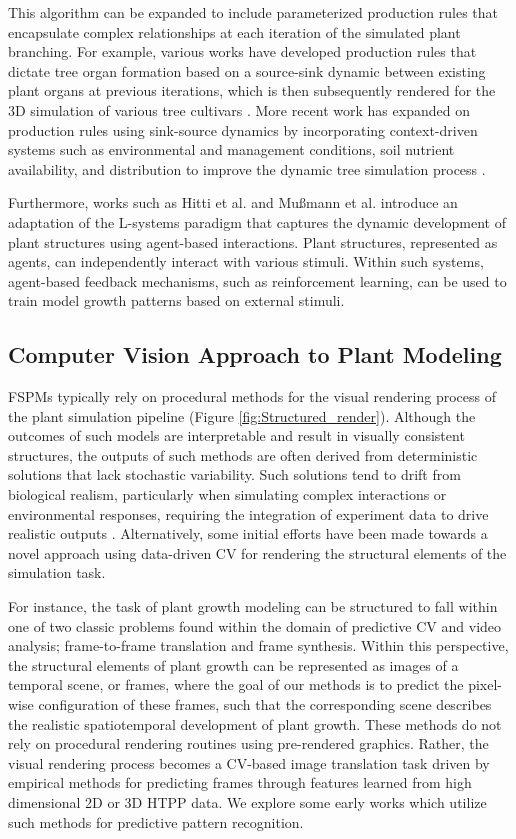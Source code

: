 \documentclass{article}
\begin{document}
\pagebreak

This algorithm can be expanded to include parameterized production rules that encapsulate complex relationships at each iteration of the simulated plant branching. For example, various works have developed production rules that dictate tree organ formation based on a source-sink dynamic between existing plant organs at previous iterations, which is then subsequently rendered for the 3D simulation of various tree cultivars \cite{LPeaches2005,dejong2015almond}. More recent work has expanded on production rules using sink-source dynamics by incorporating context-driven systems such as environmental and management conditions, soil nutrient availability, and distribution to improve the dynamic tree simulation process \cite{LPeaches2022,9231935,YANG2024122}. 

Furthermore, works such as Hitti et al. \cite{HITTI2024108613} and Mu{\ss}mann et al. \cite{10.1162/isal_a_00718} introduce an adaptation of the L-systems paradigm that captures the dynamic development of plant structures using agent-based interactions. Plant structures, represented as agents, can independently interact with various stimuli. Within such systems, agent-based feedback mechanisms, such as reinforcement learning, can be used to train model growth patterns based on external stimuli.

\subsection{Computer Vision Approach to Plant Modeling}
\label{sec:CV}
FSPMs typically rely on procedural methods for the visual rendering process of the plant simulation pipeline (Figure \ref{fig:Structured_render}). Although the outcomes of such models are interpretable and result in visually consistent structures, the outputs of such methods are often derived from deterministic solutions that lack stochastic variability. Such solutions tend to drift from biological realism, particularly when simulating complex interactions or environmental responses, requiring the integration of experiment data to drive realistic outputs \cite{10.1093/jxb/erp345}. Alternatively, some initial efforts have been made towards a novel approach using data-driven CV for rendering the structural elements of the simulation task. 

For instance, the task of plant growth modeling can be structured to fall within one of two classic problems found within the domain of predictive CV and video analysis; frame-to-frame translation and frame synthesis. Within this perspective, the structural elements of plant growth can be represented as images of a temporal scene, or frames, where the goal of our methods is to predict the pixel-wise configuration of these frames, such that the corresponding scene describes the realistic spatiotemporal development of plant growth. These methods do not rely on procedural rendering routines using pre-rendered graphics. Rather, the visual rendering process becomes a CV-based image translation task driven by empirical methods for predicting frames through features learned from high dimensional 2D or 3D HTPP data. We explore some early works which utilize such methods for predictive pattern recognition.
\end{document}

